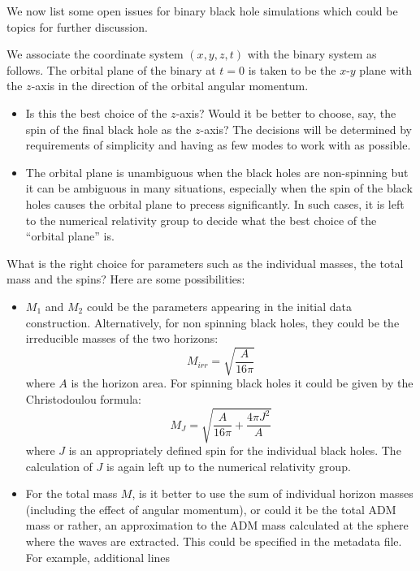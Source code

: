 \documentclass[prd,preprintnumbers,superscriptaddress,eqsecnum]{revtex4}
\numberwithin{equation}{section}
\begin{document}
{We now list some open issues for binary black hole simulations which
could be topics for further discussion.

We associate the coordinate system $(x,y,z,t)$ with the binary system
as follows.  The orbital plane of the binary at $t=0$ is taken to be
the $x$-$y$ plane with the $z$-axis in the direction of the orbital
angular momentum.
\begin{itemize}
\item Is this the best choice of the $z$-axis?  Would it be better to
  choose, say, the spin of the final black hole as the $z$-axis? The
  decisions will be determined by requirements of simplicity and
  having as few modes to work with as possible.
\item The orbital plane is unambiguous when the black holes are non-spinning
  but it can be ambiguous in many situations, especially when the spin
  of the black holes causes the orbital plane to precess significantly.
  In such cases, it is left to the numerical relativity group to decide
  what the best choice of the ``orbital plane'' is. 
\end{itemize}
What is the right choice for parameters such as the individual masses,
the total mass and the spins?  Here are some possibilities:
\begin{itemize}
\item $M_1$ and $M_2$ could be the parameters appearing in the initial
  data construction.  Alternatively, for non spinning black holes,
  they could be the irreducible masses of the two horizons:
  \begin{equation}
    \label{eq:12}
    M_{irr} = \sqrt{\frac{A}{16\pi}}
  \end{equation}
  where $A$ is the horizon area.  For spinning black holes it could be
  given by the Christodoulou formula:
  \begin{equation}
    \label{eq:13}
    M_{J} = \sqrt{\frac{A}{16\pi} + \frac{4\pi J^2}{A}}
  \end{equation}
  where $J$ is an appropriately defined spin for the individual black
  holes.  The calculation of $J$ is again left up to the numerical
  relativity group.
\item For the total mass $M$, is it better to use the sum of individual
  horizon masses (including the effect of angular momentum), or could
  it be the total ADM mass or rather, an approximation to the ADM mass
  calculated at the sphere where the waves are extracted.  This could
  be specified in the metadata file.  For example, additional lines

\end{itemize}}
\end{document}
